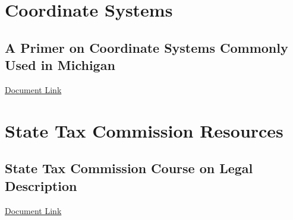 
\section{Coordinate Systems}
\subsection[Coordinate Systems for Michigan]{A Primer on Coordinate Systems Commonly Used in Michigan}
\href{../../documentation/readingRoom/geo101/MiCoordinateSystems.pdf}{Document Link}
\section{State Tax Commission Resources}
\subsection[Course on Legal Description]{State Tax Commission Course on Legal Description}
\href{../../documentation/readingRoom/geo101/State_Tax_Commission_Legal_Descriptions_Course_346936_7.pdf}{Document Link}
\clearpage


